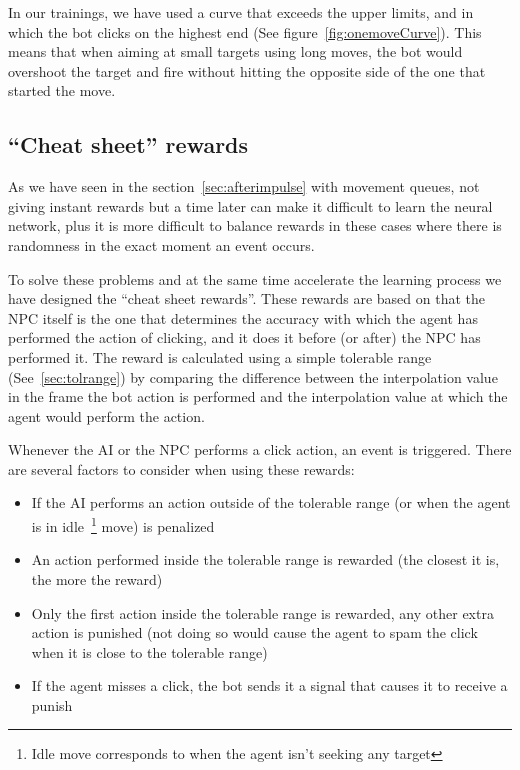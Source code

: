 In our trainings, we have used a curve that exceeds the upper limits, and in which the bot clicks on the highest end (See figure~\ref{fig:onemoveCurve}). This means that when aiming at small targets using long moves, the bot would overshoot the target and fire without hitting the opposite side of the one that started the move.

\subsection{``Cheat sheet'' rewards} %
\label{sec:cheatsheetD}

As we have seen in the section~\ref{sec:afterimpulse} with movement queues, not giving instant rewards but a time later can make it difficult to learn the neural network, plus it is more difficult to balance rewards in these cases where there is randomness in the exact moment an event occurs.

To solve these problems and at the same time accelerate the learning process we have designed the ``cheat sheet rewards''. These rewards are based on that the NPC itself is the one that determines the accuracy with which the agent has performed the action of clicking, and it does it before (or after) the NPC has performed it. The reward is calculated using a simple tolerable range (See~\ref{sec:tolrange}) by comparing the difference between the interpolation value in the frame the bot action is performed and the interpolation value at which the agent would perform the action.

Whenever the AI or the NPC performs a click action, an event is triggered. There are several factors to consider when using these rewards:
\begin{itemize}
	\item If the AI performs an action outside of the tolerable range (or when the agent is in idle~\footnote{Idle move corresponds to when the agent isn't seeking any target} move) is penalized
	\item An action performed inside the tolerable range is rewarded (the closest it is, the more the reward)
	\item Only the first action inside the tolerable range is rewarded, any other extra action is punished (not doing so would cause the agent to spam the click when it is close to the tolerable range)
	\item If the agent misses a click, the bot sends it a signal that causes it to receive a punish
\end{itemize}


